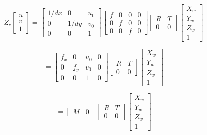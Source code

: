 \begin{equation}
{Z_c}
\left[          
  \begin{array}{c}   
    u \\
    v \\
    1
  \end{array}
\right]
=
\left[          
  \begin{array}{ccc}   
    1/dx & 0 & {u_0} \\
    0 & 1/dy & {v_0} \\
    0 & 0 & 1
  \end{array}
\right]
\left[          
  \begin{array}{cccc}   
    f & 0 & 0 & 0 \\
    0 & f & 0 & 0 \\
    0 & 0 & f & 0
  \end{array}
\right]
\left[          
  \begin{array}{cc}   
    R & T \\
    0 & 0 
  \end{array}
\right]
\left[          
  \begin{array}{c}   
    {X_w} \\
    {Y_w} \\
    {Z_w} \\
    1 
  \end{array}
\right]
\end{equation}

\begin{equation}
=
\left[          
  \begin{array}{cccc}   
    {f_x} & 0 & {u_0} & 0 \\
    0 & {f_y} & {v_0} & 0 \\
    0 & 0 & 1 & 0
  \end{array}
\right]
\left[          
  \begin{array}{cc}   
    R & T \\
    0 & 0 
  \end{array}
\right]
\left[          
  \begin{array}{c}   
    {X_w} \\
    {Y_w} \\
    {Z_w} \\
    1 
  \end{array}
\right]
\end{equation}

\begin{equation}
=
\left[          
  \begin{array}{cc}   
    M & 0
  \end{array}
\right]
\left[          
  \begin{array}{cc}   
    R & T \\
    0 & 0 
  \end{array}
\right]
\left[          
  \begin{array}{c}   
    {X_w} \\
    {Y_w} \\
    {Z_w} \\
    1 
  \end{array}
\right]
\end{equation}

